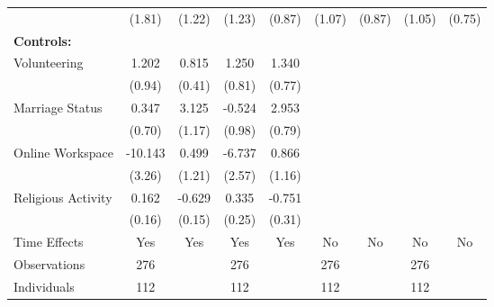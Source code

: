\begin{table}[htbp]
\begin{tabular}{l*{8}{c}}
                              &(1.81)        &(1.22)        &(1.23)        &(0.87)        &(1.07)        &(0.87)        &(1.05)        &(0.75)        \\
\textbf{Controls:}            &             &             &             &             &             &             &             &             \\
\hspace{0.25cm} Volunteering  &1.202        &0.815\sym{^+}&1.250        &1.340\sym{^+}&             &             &             &             \\
                              &(0.94)        &(0.41)        &(0.81)        &(0.77)        &             &             &             &             \\
\hspace{0.25cm} Marriage Status&0.347        &3.125\sym{*} &-0.524        &2.953\sym{**}&             &             &             &             \\
                              &(0.70)        &(1.17)        &(0.98)        &(0.79)        &             &             &             &             \\
\hspace{0.25cm} Online Workspace&-10.143\sym{**}&0.499        &-6.737\sym{*} &0.866        &             &             &             &             \\
                              &(3.26)        &(1.21)        &(2.57)        &(1.16)        &             &             &             &             \\
\hspace{0.25cm} Religious Activity&0.162        &-0.629\sym{**}&0.335        &-0.751\sym{*} &             &             &             &             \\
                              &(0.16)        &(0.15)        &(0.25)        &(0.31)        &             &             &             &             \\
Time Effects                  &  Yes        &  Yes        &  Yes        &  Yes        &   No        &   No        &   No        &   No        \\
\midrule
Observations                  &  276        &             &  276        &             &  276        &             &  276        &             \\
Individuals                   &  112        &             &  112        &             &  112        &             &  112        &             \\

\end{tabular}
\end{table}
